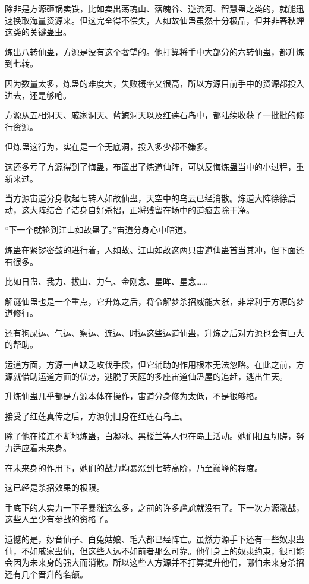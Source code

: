\begin{this_body}
除非是方源砸锅卖铁，比如卖出荡魂山、落魄谷、逆流河、智慧蛊之类的，就能迅速换取海量资源来。但这完全得不偿失，人如故仙蛊虽然十分极品，但并非春秋蝉这类的关键蛊虫。

炼出八转仙蛊，方源是没有这个奢望的。他打算将手中大部分的六转仙蛊，都升炼到七转。

因为数量太多，炼蛊的难度大，失败概率又很高，所以方源目前手中的资源都投入进去，还是够呛。

方源从五相洞天、戚家洞天、蓝鲸洞天以及红莲石岛中，都陆续收获了一批批的修行资源。

但炼蛊这行为，实在是一个无底洞，投入多少都不嫌多。

这还多亏了方源得到了悔蛊，布置出了炼道仙阵，可以反悔炼蛊当中的小过程，重新来过。

当方源宙道分身收起七转人如故仙蛊，天空中的乌云已经消散。炼道大阵徐徐启动，这大阵结合了洁身自好杀招，正将残留在场中的道痕去除干净。

“下一个就轮到江山如故蛊了。”宙道分身心中暗道。

炼蛊在紧锣密鼓的进行着，人如故、江山如故这两只宙道仙蛊首当其冲，但下面还有很多。

比如日蛊、我力、拔山、力气、金刚念、星眸、星念……

解谜仙蛊也是一个重点，它升炼之后，将令解梦杀招威能大涨，非常利于方源的梦道修行。

还有狗屎运、气运、察运、连运、时运这些运道仙蛊，升炼之后对方源也会有巨大的帮助。

运道方面，方源一直缺乏攻伐手段，但它辅助的作用根本无法忽略。在此之前，方源就借助运道方面的优势，逃脱了天庭的多座宙道仙蛊屋的追赶，逃出生天。

升炼仙蛊几乎都是方源本体在操作，宙道分身修为太低，不是很够格。

接受了红莲真传之后，方源仍旧身在红莲石岛上。

除了他在接连不断地炼蛊，白凝冰、黑楼兰等人也在岛上活动。她们相互切磋，努力适应着未来身。

在未来身的作用下，她们的战力均暴涨到七转高阶，乃至巅峰的程度。

这已经是杀招效果的极限。

手底下的人实力一下子暴涨这么多，之前的许多尴尬就没有了。下一次方源激战，这些人至少有参战的资格了。

遗憾的是，妙音仙子、白兔姑娘、毛六都已经阵亡。虽然方源手下还有一些奴隶蛊仙，不如戚家蛊仙，但这些人远不如前者那么可靠。他们身上的奴隶约束，很可能会因为未来身的强大而消散。所以这些人方源并不打算提升他们，哪怕未来身杀招还有几个晋升的名额。


\end{this_body}
